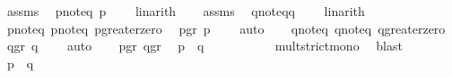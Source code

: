 \begin{isabellebody}
\ assms{\isacharparenleft}{\kern0pt}{}{\isacharparenright}{\kern0pt}\ \isamarkupfalse%
\ p{\isacharunderscore}{\kern0pt}noteq{\isacharunderscore}{\kern0pt}{}{\isacharcolon}{\kern0pt}\ {\isachardoublequoteopen}p\ {\isasymnoteq}\ {}{\isachardoublequoteclose}\ \isamarkupfalse%
\ linarith\isanewline
\ \ \isamarkupfalse%
\ assms{\isacharparenleft}{\kern0pt}{}{\isacharparenright}{\kern0pt}\ \isamarkupfalse%
\ q{\isacharunderscore}{\kern0pt}noteq{\isacharunderscore}{\kern0pt}{}{\isacharcolon}{\kern0pt}{\isachardoublequoteopen}q\ {\isasymnoteq}\ {}{\isachardoublequoteclose}\ \isamarkupfalse%
\ linarith\isanewline
\ \ \isamarkupfalse%
\ p{\isacharunderscore}{\kern0pt}noteq{\isacharunderscore}{\kern0pt}{}\ p{\isacharunderscore}{\kern0pt}noteq{\isacharunderscore}{\kern0pt}{}\ p{\isacharunderscore}{\kern0pt}greater{\isacharunderscore}{\kern0pt}zero\ \isamarkupfalse%
\ p{\isacharunderscore}{\kern0pt}gr{\isacharunderscore}{\kern0pt}{}{\isacharcolon}{\kern0pt}\ {\isachardoublequoteopen}p\ {\isachargreater}{\kern0pt}\ {}{\isachardoublequoteclose}\ \isamarkupfalse%
\ auto\isanewline
\ \ \isamarkupfalse%
\ q{\isacharunderscore}{\kern0pt}noteq{\isacharunderscore}{\kern0pt}{}\ q{\isacharunderscore}{\kern0pt}noteq{\isacharunderscore}{\kern0pt}{}\ q{\isacharunderscore}{\kern0pt}greater{\isacharunderscore}{\kern0pt}zero\ \isamarkupfalse%
\ q{\isacharunderscore}{\kern0pt}gr{\isacharunderscore}{\kern0pt}{}{\isacharcolon}{\kern0pt}\ {\isachardoublequoteopen}q\ {\isachargreater}{\kern0pt}\ {}{\isachardoublequoteclose}\ \isamarkupfalse%
\ auto\isanewline
\isanewline
\ \ \isamarkupfalse%
\ p{\isacharunderscore}{\kern0pt}gr{\isacharunderscore}{\kern0pt}{}\ q{\isacharunderscore}{\kern0pt}gr{\isacharunderscore}{\kern0pt}{}\ \isamarkupfalse%
\ {\isachardoublequoteopen}p\ {\isacharasterisk}{\kern0pt}\ q\ {\isachargreater}{\kern0pt}\ {}\ {\isacharasterisk}{\kern0pt}\ {}{\isachardoublequoteclose}\ \isanewline
\ \ \ \ \isamarkupfalse%
\ mult{\isacharunderscore}{\kern0pt}strict{\isacharunderscore}{\kern0pt}mono\ \isamarkupfalse%
\ blast\isanewline
\ \ \isamarkupfalse%
\ \isamarkupfalse%
\ {\isachardoublequoteopen}p\ {\isacharasterisk}{\kern0pt}\ q\ {\isachargreater}{\kern0pt}\ {}\ {\isacharcircum}{\kern0pt}\ {}{\isachardoublequoteclose}\ \isamarkupfalse%

\end{isabellebody}
